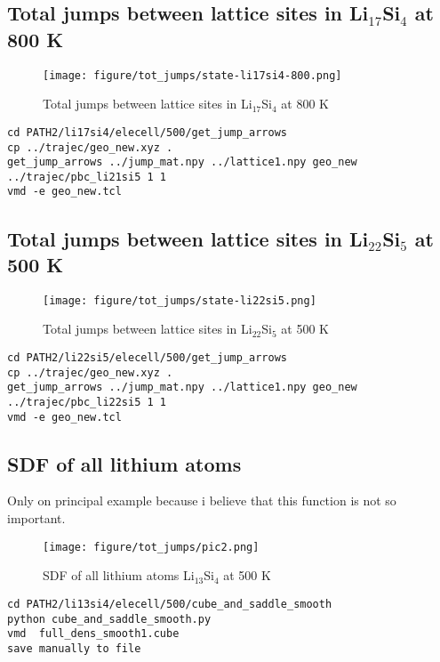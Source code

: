 \documentclass{article}
\begin{document}
\FloatBarrier
\subsection{Total jumps between lattice sites in Li$_17$Si$_4$ at 800 K}

\begin{figure}[h!]
\centering
\texttt{[image: figure/tot\_jumps/state-li17si4-800.png]}
\caption{Total jumps between lattice sites in Li$_17$Si$_4$ at 800 K} 
\end{figure}
\begin{verbatim}
cd PATH2/li17si4/elecell/500/get_jump_arrows
cp ../trajec/geo_new.xyz .
get_jump_arrows ../jump_mat.npy ../lattice1.npy geo_new ../trajec/pbc_li21si5 1 1
vmd -e geo_new.tcl
\end{verbatim}

\FloatBarrier
\subsection{Total jumps between lattice sites in Li$_22$Si$_5$ at 500 K}

\begin{figure}[h!]
\centering
\texttt{[image: figure/tot\_jumps/state-li22si5.png]}
\caption{Total jumps between lattice sites in  Li$_22$Si$_5$ at 500 K} 
\end{figure}
\begin{verbatim}
cd PATH2/li22si5/elecell/500/get_jump_arrows
cp ../trajec/geo_new.xyz .
get_jump_arrows ../jump_mat.npy ../lattice1.npy geo_new ../trajec/pbc_li22si5 1 1
vmd -e geo_new.tcl
\end{verbatim}



\FloatBarrier
 \subsection{SDF of all lithium atoms}
 Only on principal example because i believe that this function is not so important.
 \begin{figure}[h!]
\centering
\texttt{[image: figure/tot\_jumps/pic2.png]}
\caption{SDF of all lithium atoms Li$_13$Si$_4$ at 500 K} 
\end{figure}
\begin{verbatim}
cd PATH2/li13si4/elecell/500/cube_and_saddle_smooth
python cube_and_saddle_smooth.py
vmd  full_dens_smooth1.cube
save manually to file

\end{verbatim}
\FloatBarrier
\end{document}
